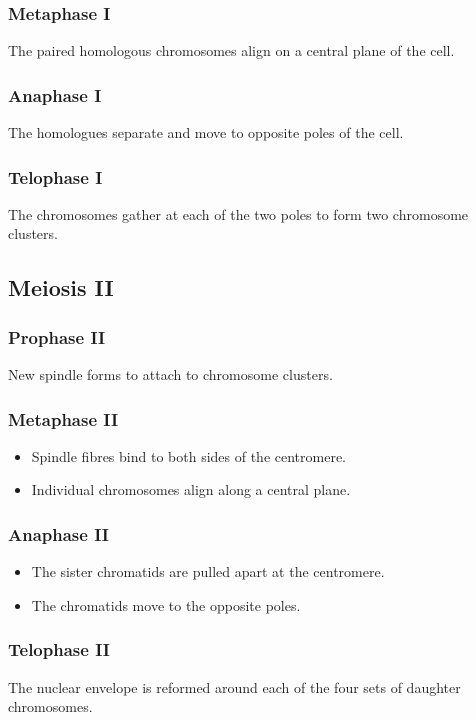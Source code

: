 \documentclass[11pt]{article}
\begin{document}
\subsubsection{Metaphase I}
\label{sec:org42b9059}
The paired homologous chromosomes align on a central plane of the cell.
\subsubsection{Anaphase I}
\label{sec:orgc3ff08c}
The homologues separate and move to opposite poles of the cell.
\subsubsection{Telophase I}
\label{sec:org54954bc}
The chromosomes gather at each of the two poles to form two chromosome clusters.
\subsection{Meiosis II}
\label{sec:org6d9ff14}

\subsubsection{Prophase II}
\label{sec:orgff8b210}
New spindle forms to attach to chromosome clusters.
\subsubsection{Metaphase II}
\label{sec:orgce7baab}
\begin{itemize}
\item Spindle fibres bind to both sides of the centromere.
\item Individual chromosomes align along a central plane.
\end{itemize}
\subsubsection{Anaphase II}
\label{sec:orgd060e00}
\begin{itemize}
\item The sister chromatids are pulled apart at the centromere.
\item The chromatids move to the opposite poles.
\end{itemize}
\subsubsection{Telophase II}
\label{sec:orgea9e97d}
The nuclear envelope is reformed around each of the four sets of daughter chromosomes.
\end{document}
